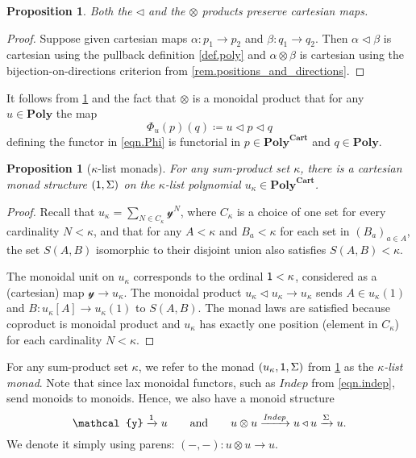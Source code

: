 \documentclass[11pt, one side, article]{memoir}
\theoremstyle{definition}
\theoremstyle{plain}
\newtheorem{proposition}[definitionx]{Proposition}
\newenvironment{definition}
  {\pushQED{\qed}\renewcommand{\qedsymbol}{$\lozenge$}\definitionx}
  {\popQED\enddefinitionx}
\newcommand{\Cat}[1]{\mathbf{#1}}%
\newcommand{\Fun}[1]{\mathit{#1}}%
\newcommand{\To}[2][]{\xrightarrow[#1]{#2}}
\newcommand{\yon}{\mathcal{y}}
\newcommand{\poly}{\Cat{Poly}}
\newcommand{\polycart}{\poly^{\Cat{Cart}}}
\newcommand{\0}{\textsf{0}}
\newcommand{\1}{\tn{\textsf{1}}}
\newcommand{\tri}{\mathbin{\triangleleft}}
\newcommand{\indep}{\Fun{Indep}}
\newcommand{\qqand}{\qquad\text{and}\qquad}
\begin{document}
\begin{proposition}\label{prop.tri_dir_cartesian}
Both the $\tri$ and the $\otimes$ products preserve cartesian maps.
\end{proposition}
\begin{proof}
Suppose given cartesian maps $\alpha\colon p_1\to p_2$ and $\beta\colon q_1\to q_2$. Then $\alpha\tri\beta$ is cartesian using the pullback definition \cref{def.poly} and $\alpha\otimes\beta$ is cartesian using the bijection-on-directions criterion from \cref{rem.positions_and_directions}.
\end{proof}

It follows from \cref{prop.tri_dir_cartesian} and the fact that $\otimes$ is a monoidal product that for any $u\in\poly$ the map
\[
	\Phi_u(p)(q)\coloneqq u\tri p\tri q
\]
defining the functor in \eqref{eqn.Phi} is functorial in $p\in\polycart$ and $q\in\poly$.

\begin{proposition}[$\kappa$-list monads]\label{prop.list_monad}
For any sum-product set $\kappa$, there is a cartesian monad structure $(\1,\Sigma)$ on the $\kappa$-list polynomial $u_\kappa\in\polycart$.
\end{proposition}
\begin{proof}
Recall that $u_\kappa=\sum_{N\in C_\kappa}\yon^N$, where $C_\kappa$ is a choice of one set for every cardinality $N<\kappa$, and that for any $A<\kappa$ and $B_a<\kappa$ for each set in $(B_a)_{a\in A}$, the set $S(A,B)$ isomorphic to their disjoint union also satisfies $S(A,B)<\kappa$. 

The monoidal unit on $u_\kappa$ corresponds to the ordinal $\1<\kappa$, considered as a (cartesian) map $\yon\to u_\kappa$. The monoidal product $u_\kappa\tri u_\kappa\to u_\kappa$ sends $A\in u_\kappa(1)$ and $B\colon u_\kappa[A]\to u_\kappa(1)$ to $S(A,B)$. The monad laws are satisfied because coproduct is monoidal product and $u_\kappa$ has exactly one position (element in $C_\kappa$) for each cardinality $N<\kappa$. 
\end{proof}

\begin{definition}[$\kappa$-list monads]
For any sum-product set $\kappa$, we refer to the monad $(u_\kappa,\1,\Sigma)$ from \cref{prop.list_monad} as the \emph{$\kappa$-list monad}. Note that since lax monoidal functors, such as $\indep$ from \eqref{eqn.indep}, send monoids to monoids. Hence, we also have a monoid structure 
\begin{equation}\label{eqn.otimes_monoid}
	\yon\To{\1} u
	\qqand
	u\otimes u\To{\indep} u\tri u\To{\Sigma}u.
\end{equation}
We denote it simply using parens: $(-,-)\colon u\otimes u\to u$.
\end{definition}
\end{document}
